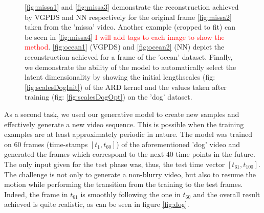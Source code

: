 \documentclass{article} %
\begin{document}
\begin{figure}[ht]
\begin{center}
{}
\end{center}
\caption{\small{
\ref{fig:missa1} and \ref{fig:missa3} demonstrate the reconstruction achieved by VGPDS and NN respectively for the original frame \ref{fig:missa2} taken from the 'missa' video. Another example (cropped to fit) can be seen in \ref{fig:missa4} \textcolor{red}{I will add tags to each image to show the method}. \ref{fig:ocean1} (VGPDS) and \ref{fig:ocean2} (NN) depict the reconstruction achieved for a frame of the 'ocean' dataset. 
Finally, we demonstrate the ability of the model to automatically select the latent dimensionality by showing the initial lengthscales (fig: \ref{fig:scalesDogInit}) of the ARD kernel and the values taken after training (fig: \ref{fig:scalesDogOpt}) on the 'dog' dataset.
}
}
\label{fig:video1}
\end{figure}

\par As a second task, we used our generative model to create new samples and effectively generate a new video sequence. This is possible when the training examples are at least approximately periodic in nature. The model was trained on 60 frames (time-stamps $[t_1, t_{60}]$) of the aforementioned 'dog' video and generated the frames which correspond to the next 40 time points in the future. The only input given for the test phase was, thus, the test time vector $[t_{61}, t_{100}]$. The challenge is not only to generate a non-blurry video, but also to resume the motion while performing the transition from the training to the test frames. Indeed, the frame in $t_{61}$ is smoothly following the one in $t_{60}$ and the overall result achieved is quite realistic, as can be seen in figure \ref{fig:dog}. 
\end{document}
